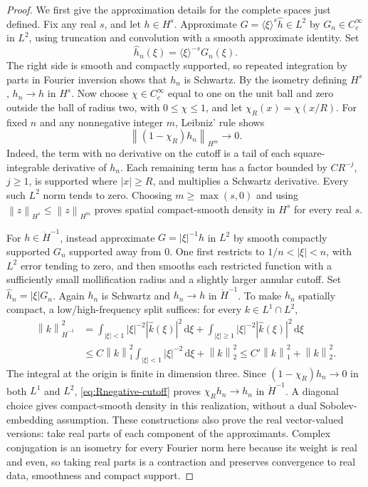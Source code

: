 \documentclass[11pt,a4paper]{article}
\theoremstyle{definition}\newtheorem{definition}[theorem]{Definition}
\theoremstyle{remark}\newtheorem{remark}[theorem]{Remark}
\newcommand{\dd}{\,\mathrm d}\newcommand{\eps}{\varepsilon}
\newcommand{\norm}[1]{\left\lVert#1\right\rVert}
\begin{document}
\begin{proof}
We first give the approximation details for the complete spaces just defined. Fix any real $s$, and let $h\in H^s$. Approximate $G=\langle\xi\rangle^s\widehat h\in L^2$ by $G_n\in C_c^\infty$ in $L^2$, using truncation and convolution with a smooth approximate identity. Set
\[
 \widehat h_n(\xi)=\langle\xi\rangle^{-s}G_n(\xi).
\]
The right side is smooth and compactly supported, so repeated integration by parts in Fourier inversion shows that $h_n$ is Schwartz. By the isometry defining $H^s$, $h_n\to h$ in $H^s$. Now choose $\chi\in C_c^\infty$ equal to one on the unit ball and zero outside the ball of radius two, with $0\le\chi\le1$, and let $\chi_R(x)=\chi(x/R)$. For fixed $n$ and any nonnegative integer $m$, Leibniz' rule shows
\[
 \norm{(1-\chi_R)h_n}_{H^m}\longrightarrow0.
\]
Indeed, the term with no derivative on the cutoff is a tail of each square-integrable derivative of $h_n$. Each remaining term has a factor bounded by $C R^{-j}$, $j\ge1$, is supported where $|x|\ge R$, and multiplies a Schwartz derivative. Every such $L^2$ norm tends to zero. Choosing $m\ge\max(s,0)$ and using $\norm{z}_{H^s}\le\norm{z}_{H^m}$ proves spatial compact-smooth density in $H^s$ for every real $s$.

For $h\in\dot H^{-1}$, instead approximate $G=|\xi|^{-1}\widehat h$ in $L^2$ by smooth compactly supported $G_n$ supported away from $0$. One first restricts to $1/n<|\xi|<n$, with $L^2$ error tending to zero, and then smooths each restricted function with a sufficiently small mollification radius and a slightly larger annular cutoff. Set $\widehat h_n=|\xi|G_n$. Again $h_n$ is Schwartz and $h_n\to h$ in $\dot H^{-1}$. To make $h_n$ spatially compact, a low/high-frequency split suffices: for every $k\in L^1\cap L^2$,
\begin{align}
 \norm{k}_{\dot H^{-1}}^2
 &=\int_{|\xi|<1}|\xi|^{-2}|\widehat k(\xi)|^2\dd\xi
    +\int_{|\xi|\ge1}|\xi|^{-2}|\widehat k(\xi)|^2\dd\xi\nonumber\\
 &\le C\norm{k}_1^2\int_{|\xi|<1}|\xi|^{-2}\dd\xi+\norm{k}_2^2
 \le C'\norm{k}_1^2+\norm{k}_2^2.\label{eq:Rnegative-cutoff}
\end{align}
The integral at the origin is finite in dimension three. Since $(1-\chi_R)h_n\to0$ in both $L^1$ and $L^2$, \eqref{eq:Rnegative-cutoff} proves $\chi_Rh_n\to h_n$ in $\dot H^{-1}$. A diagonal choice gives compact-smooth density in this realization, without a dual Sobolev-embedding assumption. These constructions also prove the real vector-valued versions: take real parts of each component of the approximants. Complex conjugation is an isometry for every Fourier norm here because its weight is real and even, so taking real parts is a contraction and preserves convergence to real data, smoothness and compact support.


\end{proof}
\end{document}
